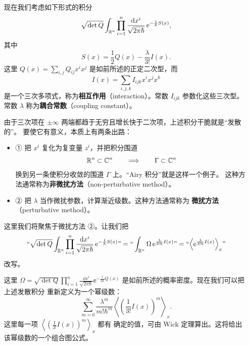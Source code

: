 现在我们考虑如下形式的积分
\[
  \sqrt{\det Q}\int_{\mathbb{R}^{n}}\prod_{i=1}^{n}\frac{\mathrm{d} x^{i}}{\sqrt{2\pi\hbar}}\,
  \mathrm{e}^{-\frac{1}{\hbar}S(x)},
\]
其中
\[
  S(x)=\frac{1}{2}Q(x)-\frac{\lambda}{3!}I(x).
\]
这里 $Q(x)=\sum_{i,j}Q_{ij}x^{i}x^{j}$ 是如前所述的正定二次型，而
\[
  I(x)=\sum_{i,j,k}I_{ijk}x^{i}x^{j}x^{k}
\]
是一个三次多项式，称为\textbf{相互作用}（interaction）。常数 $I_{ijk}$ 参数化这些三次型。
常数 $\lambda$ 称为\textbf{耦合常数}（coupling constant）。

由于三次项在 $\pm\infty$ 两端都趋于无穷且增长快于二次项，上述积分干脆就是“发散的”。
要使它有意义，本质上有两条出路：

\begin{itemize}[leftmargin=1.6em,itemsep=0.3em]
  \item ① 把 $x^{i}$ 复化为复变量 $z^{i}$，并把积分围道
        \[
          \mathbb{R}^{n}\subset\mathbb{C}^{n}\qquad\Longrightarrow\qquad \Gamma\subset\mathbb{C}^{n}
        \]
        换到另一条使积分收敛的围道 $\Gamma$ 上。“Airy 积分”就是这样一个例子。
        这种方法通常称为\textbf{非微扰方法}（non-perturbative method）。
  \item ② 把 $\lambda$ 当作微扰参数，计算渐近级数。这种方法通常称为
        \textbf{微扰方法}（perturbative method）。
\end{itemize}


这里我们将聚焦于微扰方法 ②。让我们把
\[
  \text{“}\sqrt{\det Q}\int_{\mathbb{R}^{n}}\prod_{i=1}^{n}\frac{\mathrm{d} x^{i}}
  {\sqrt{2\pi\hbar}}\,\mathrm{e}^{-\frac{1}{\hbar}S(x)}\text{”}
  =\text{“}\int_{\mathbb{R}^{n}}\Omega\,\mathrm{e}^{\frac{\lambda}{3!\hbar}I(x)}\text{”}
  =\text{“}\Bigl\langle \mathrm{e}^{\frac{\lambda}{3!\hbar}I(x)}\Bigr\rangle_x
  \text{”}
\]
改写。

这里 $\Omega=\sqrt{\det Q}\prod_{i=1}^{n}\frac{\dd x^{i}}{\sqrt{2\pi\hbar}}
\ee^{-\frac{1}{2\hbar}Q(x)}$ 是如前所述的概率密度。现在我们可以把上述发散积分
重新定义为一个幂级数：
\[
  \sum_{m=0}^{\infty}\frac{\lambda^{m}}{m!\hbar^{m}}
  \left\langle\left(\frac{1}{3!}I(x)\right)^{m}\right\rangle_x.
\]
这里每一项 $\left\langle\left(\frac{1}{3!}I(x)\right)^{m}\right\rangle_x$ 都有
确定的值，可由 Wick 定理算出。这将给出该幂级数的一个组合图公式。

